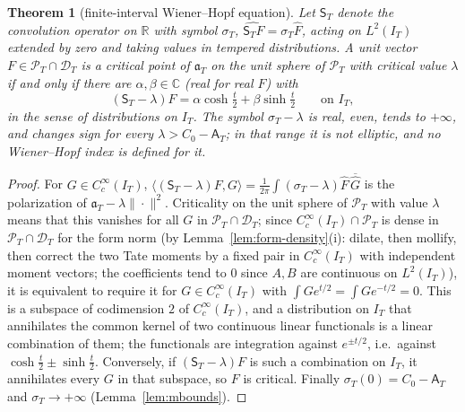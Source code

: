 \documentclass[10pt]{amsart}
\newtheorem{theorem}{Theorem}[section]
\theoremstyle{definition}
\theoremstyle{remark}
\newcommand{\C}{\mathbb C}
\newcommand{\R}{\mathbb R}
\newcommand{\PT}{\mathcal P_T}
\newcommand{\IT}{I_T}
\newcommand{\sT}{\sigma_T}
\newcommand{\Fh}{\widehat F}
\newcommand{\Aconst}{\mathsf A_T}
\begin{document}
\begin{theorem}[finite-interval Wiener--Hopf equation]\label{thm:W}
Let $\mathsf S_T$ denote the convolution operator on $\R$ with symbol $\sT$,
$\widehat{\mathsf S_TF}=\sT\Fh$, acting on $L^2(\IT)$ extended by zero and taking values in tempered
distributions. A unit vector $F\in\PT\cap\mathcal D_T$ is a critical point of $\mathfrak a_T$ on the unit
sphere of $\PT$ with critical value $\lambda$ if and only if there are $\alpha,\beta\in\C$ (real for real
$F$) with
\[
(\mathsf S_T-\lambda)F=\alpha\cosh\tfrac t2+\beta\sinh\tfrac t2\qquad\text{on }\IT,
\]
in the sense of distributions on $\IT$. The symbol $\sT-\lambda$ is real, even, tends to
$+\infty$, and changes sign for every $\lambda>C_0-\Aconst$; in that range it is not elliptic, and no
Wiener--Hopf index is defined for it.
\end{theorem}
\begin{proof}
For $G\in C_c^\infty(\IT)$, $\langle(\mathsf S_T-\lambda)F,G\rangle=\frac1{2\pi}\int(\sT-\lambda)\Fh\,\overline{\widehat G}$
is the polarization of $\mathfrak a_T-\lambda\|\cdot\|^2$. Criticality on the unit sphere of $\PT$
with value $\lambda$ means that this vanishes for all $G$ in $\PT\cap\mathcal D_T$; since
$C_c^\infty(\IT)\cap\PT$ is dense in $\PT\cap\mathcal D_T$ for the form norm (by Lemma~\ref{lem:form-density}(i):
dilate, then mollify, then correct the two Tate moments by a fixed pair in $C_c^\infty(\IT)$ with independent
moment vectors; the coefficients tend to $0$ since $A,B$ are continuous on $L^2(\IT)$), it is equivalent to require it for
$G\in C_c^\infty(\IT)$ with $\int Ge^{t/2}=\int Ge^{-t/2}=0$. This is a subspace of codimension $2$
of $C_c^\infty(\IT)$, and a distribution on $\IT$ that annihilates the common kernel of two continuous
linear functionals is a linear combination of them; the functionals are integration against
$e^{\pm t/2}$, i.e.\ against $\cosh\frac t2\pm\sinh\frac t2$. Conversely, if $(\mathsf S_T-\lambda)F$
is such a combination on $\IT$, it annihilates every $G$ in that subspace, so $F$ is critical. Finally
$\sT(0)=C_0-\Aconst$ and $\sT\to+\infty$ (Lemma~\ref{lem:mbounds}).
\end{proof}
\end{document}
